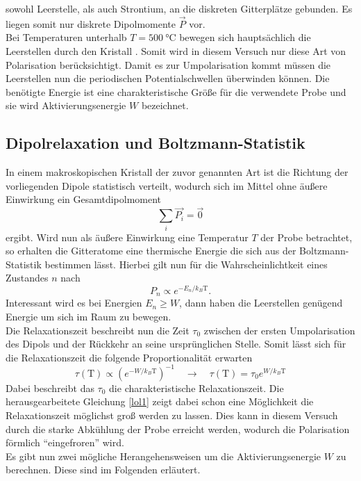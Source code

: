 sowohl Leerstelle, als auch Strontium, an die diskreten Gitterplätze gebunden. Es liegen somit nur diskrete Dipolmomente $\vec{P}$ vor.
\\
Bei Temperaturen unterhalb $T = \SI{500}{\celsius}$ bewegen sich hauptsächlich die Leerstellen durch den Kristall \cite{altskript}. Somit wird in diesem Versuch nur diese Art von Polarisation berücksichtigt.
Damit es zur Umpolarisation kommt müssen die Leerstellen nun die periodischen Potentialschwellen überwinden können. Die benötigte Energie ist eine charakteristische Größe für die verwendete Probe und 
sie wird Aktivierungsenergie $W$ bezeichnet.

\subsection{Dipolrelaxation und Boltzmann-Statistik}
In einem makroskopischen Kristall der zuvor genannten Art ist die Richtung der vorliegenden Dipole statistisch verteilt, wodurch sich im Mittel ohne äußere Einwirkung ein Gesamtdipolmoment
\begin{equation*}
\sum_{i} \vec{P_{i}} = \vec{0}
\end{equation*}
ergibt. Wird nun als äußere Einwirkung eine Temperatur $T$ der Probe betrachtet, so erhalten die Gitteratome eine thermische Energie die sich aus der Boltzmann-Statistik bestimmen lässt.
Hierbei gilt nun für die Wahrscheinlichtkeit eines Zustandes $n$ nach \cite{Briels2016}
\begin{equation*}
P_n \propto e^{- E_n / k_{B}\text{T}}.
\end{equation*}
Interessant wird es bei Energien $E_n \geq W$, dann haben die Leerstellen genügend Energie um sich im Raum zu bewegen.
\\
Die Relaxationszeit beschreibt nun die Zeit $\tau_0$ zwischen der ersten Umpolarisation des Dipols und der Rückkehr an seine ursprünglichen Stelle.
Somit lässt sich für die Relaxationszeit die folgende Proportionalität erwarten
\begin{equation}
    \label{eqn:lol1}
\tau(\text{T}) \propto  \left( e^{- W / k_{B}\text{T}}\right)^{-1} \quad \to \quad \tau(\text{T}) = \tau_0  e^{ W / k_{B}\text{T}}
\end{equation}
Dabei beschreibt das $\tau_0$ die charakteristische Relaxationszeit.
Die herausgearbeitete Gleichung \eqref{lol1} zeigt dabei schon eine Möglichkeit die Relaxationszeit möglichst groß werden zu lassen. Dies kann in diesem Versuch durch die starke Abkühlung der Probe
erreicht werden, wodurch die Polarisation förmlich \enquote{eingefroren} wird.
\\
Es gibt nun zwei mögliche Herangehensweisen um die Aktivierungsenergie $W$ zu berechnen. Diese sind im Folgenden erläutert.

